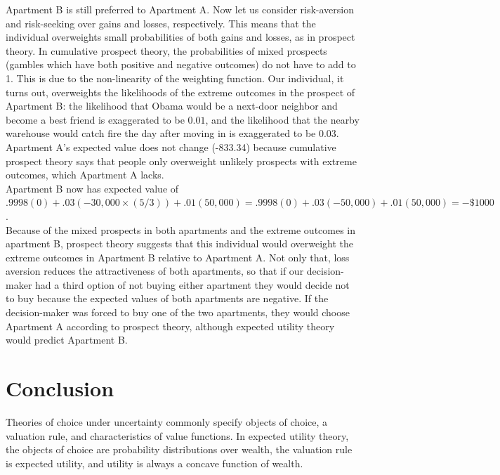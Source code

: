 \documentclass[a4paper,12pt]{article}
\numberwithin{equation}{section}
\theoremstyle{definition}
\begin{document}
Apartment B is still preferred to Apartment A. Now let us consider risk-aversion and risk-seeking over gains and losses, respectively. This means that the individual overweights small probabilities of both gains and losses, as in prospect theory. In cumulative prospect theory, the probabilities of mixed prospects (gambles which have both positive and negative outcomes) do not have to add to 1. This is due to the non-linearity of the weighting function. Our individual, it turns out, overweights the likelihoods of the extreme outcomes in the prospect of Apartment B: the likelihood that Obama would be a next-door neighbor and become a best friend is exaggerated to be $0.01$, and the likelihood that the nearby warehouse would catch fire the day after moving in is exaggerated to be $0.03$.
\\

Apartment A's expected value does not change (-833.34) because cumulative prospect theory says that people only overweight unlikely prospects with extreme outcomes, which Apartment A lacks.
\\

Apartment B now has expected value of
$.9998(0)+.03(-30,000\times(5/3))+.01(50,000) = .9998(0)+.03(-50,000)+.01(50,000) = -\$1000$.
\\


Because of the mixed prospects in both apartments and the extreme outcomes in apartment B, prospect theory suggests that this individual would overweight the extreme outcomes in Apartment B relative to Apartment A. Not only that, loss aversion reduces the attractiveness of both apartments, so that if our decision-maker had a third option of not buying either apartment they would decide not to buy because the expected values of both apartments are negative. If the decision-maker was forced to buy one of the two apartments, they would choose Apartment A according to prospect theory, although expected utility theory would predict Apartment B.


\section{Conclusion}
\indent Theories of choice under uncertainty commonly specify objects of choice, a valuation rule, and characteristics of value functions. In expected utility theory, the objects of choice are probability distributions over wealth, the valuation rule is expected utility, and utility is always a concave function of wealth.
\\
\end{document}
